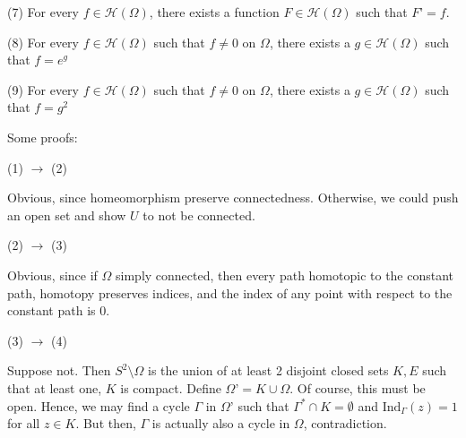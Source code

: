 \documentclass[10pt]{article}
\newcommand{\calH}{\mathcal{H}}
\newcommand{\ind}{\text{Ind}}
\begin{document}
(7) For every $f \in \calH(\Omega)$, there exists a function $F \in \calH(\Omega)$ such that $F’ = f$. 

(8) For every $f \in \calH(\Omega)$ such that $f \not = 0$ on $\Omega$, there exists a $g \in \calH(\Omega)$ such that $f = e^{g}$

(9) For every $f \in \calH(\Omega)$ such that $f \not = 0$ on $\Omega$, there exists a $g \in \calH(\Omega)$ such that $f = g^2$

Some proofs:

(1) $\to$ (2)

Obvious, since homeomorphism preserve connectedness. Otherwise, we could push an open set and show $U$ to not be connected.

(2) $\to$ (3)

Obvious, since if $\Omega$ simply connected, then every path homotopic to the constant path, homotopy preserves indices, and the index of any point with respect to the constant path is $0$.

(3) $\to$ (4)

Suppose not. Then $S^2 \setminus \Omega$ is the union of at least 2 disjoint closed sets $K, E$ such that at least one, $K$ is compact. Define $\Omega’ = K \cup \Omega$. Of course, this must be open. Hence, we may find a cycle $\Gamma$ in $\Omega’$ such that $\Gamma^* \cap K = \emptyset$ and $\ind_\Gamma(z) = 1$ for all $z \in K$. But then, $\Gamma$ is actually also a cycle in $\Omega$, contradiction.
\end{document}
